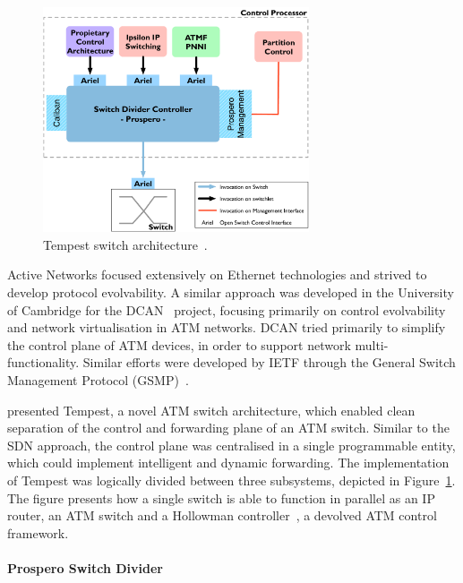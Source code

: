 \begin{figure}
  \begin{center}
\includegraphics[width=0.7\textwidth]{Background/BackgroundFigs/tempest_arch}
\caption{Tempest switch architecture~.}
\label{fig:background:tempest_arch}
\end{center}
\end{figure}

Active Networks focused extensively on Ethernet technologies and strived to
develop protocol evolvability. A similar approach was developed in the
University of Cambridge for the DCAN~ project, focusing
primarily on control evolvability and network virtualisation in ATM networks.
DCAN tried primarily to simplify the control plane of ATM devices, in order to
support network multi-functionality. Similar efforts were developed by IETF
through the General Switch Management Protocol (GSMP)~.

 presented Tempest, a novel ATM switch architecture, which
enabled clean separation of the control and forwarding plane of an ATM
switch. Similar to the SDN approach,  the control plane was centralised in a
single programmable entity, which could implement intelligent and dynamic
forwarding.  The implementation of Tempest was logically divided between three
subsystems, depicted in Figure~\ref{fig:background:tempest_arch}. The figure
presents how a single switch is able to function in parallel as an IP router, an
ATM switch and a Hollowman controller~, a devolved ATM
control framework. 

\paragraph{Prospero Switch Divider} 

